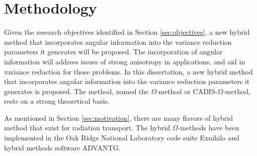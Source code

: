 \section{Methodology}
\label{sec:methodology}

Given the research objectives identified in Section \ref{sec:objectives}, a new
hybrid method that incorporates angular information into the variance reduction
parameters it generates will be proposed. The incorporation of angular
information will address issues of strong anisotropy in applications,
and aid in variance reduction for those problems.
In this dissertation, a new hybrid method that incorporates angular information
into the variance reduction parameters it generates is proposed. The method,
named the $\Omega$-method or CADIS-$\Omega$-method, rests on a strong
theoretical basis.

As mentioned in Section \ref{sec:motivation}, there are many flavors of hybrid
method that exist for radiation transport. The hybrid $\Omega$-methods
have been implemented in the Oak Ridge National Laboratory code suite
Exnihilo and hybrid methods software ADVANTG.


